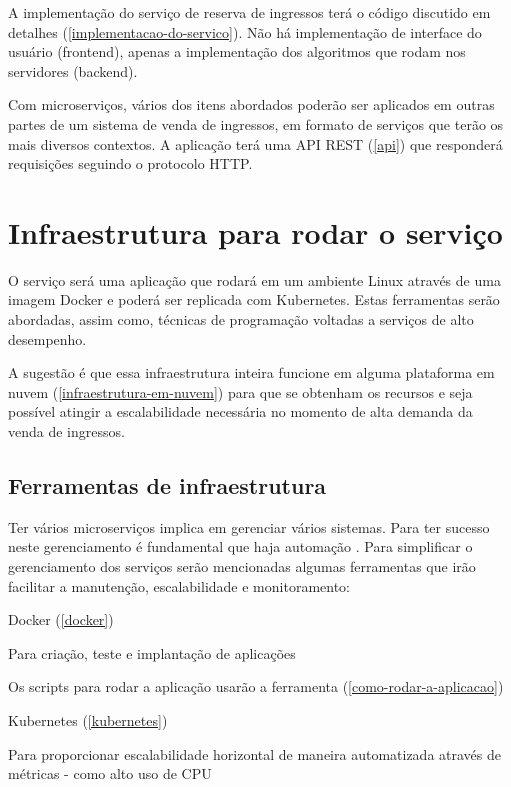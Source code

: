 A implementação do serviço de reserva de ingressos terá o código discutido
em detalhes (\autoref{implementacao-do-servico}). Não há implementação
de interface do usuário (frontend), apenas a implementação dos algoritmos
que rodam nos servidores (backend).

Com microserviços, vários dos itens abordados poderão ser aplicados em outras partes
de um sistema
de venda de ingressos, em formato de serviços que terão os mais diversos contextos.
A aplicação terá uma API REST (\autoref{api}) que responderá requisições
seguindo o protocolo HTTP.

\section{Infraestrutura para rodar o serviço}

O serviço será uma aplicação que rodará em um ambiente Linux através
de uma imagem Docker e poderá ser replicada com Kubernetes.
Estas ferramentas serão abordadas, assim como, técnicas de programação
voltadas a serviços de alto desempenho.

A sugestão é que essa infraestrutura inteira funcione em alguma plataforma em nuvem
(\autoref{infraestrutura-em-nuvem}) para que se obtenham os recursos e seja possível atingir
a escalabilidade necessária no momento de alta demanda da venda de ingressos.

\subsection{Ferramentas de infraestrutura}

Ter vários microserviços implica em gerenciar
vários sistemas.
Para ter sucesso neste gerenciamento é fundamental que haja automação
\cite{martin-fowler-microservices}.
Para simplificar o gerenciamento dos serviços serão mencionadas algumas ferramentas que
irão facilitar a manutenção, escalabilidade e monitoramento:

\begin{alineas}

  \item Docker (\autoref{docker})

  \begin{alineas}
     \item Para criação, teste e implantação de aplicações \cite{aws-o-que-e-o-docker}
     \item Os scripts para rodar a aplicação usarão a ferramenta
           (\autoref{como-rodar-a-aplicacao})
  \end{alineas}

  \item Kubernetes (\autoref{kubernetes})

  \begin{alineas}
     \item Para proporcionar escalabilidade horizontal de maneira automatizada através de métricas
           - como alto uso de CPU \cite{kubernetes-horizontal-pod-autoscaling}
  \end{alineas}

\end{alineas}
